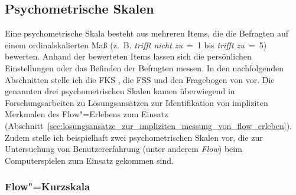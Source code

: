 \subsection{Psychometrische Skalen} 

\label{sub:psychometrische_skalen}

Eine psychometrische Skala besteht aus mehreren Items, die die Befragten auf einem ordinalskalierten Maß (z.~B. \emph{trifft nicht zu}~=~1 bis \emph{trifft zu}~=~5) bewerten. Anhand der bewerteten Items lassen sich die persönlichen Einstellungen oder das Befinden der Befragten messen. In den nachfolgenden Abschnitten stelle ich die \ac{FKS} \citep{Rheinberg2003}, die \ac{FSS} \citep{Jackson1996} und den Fragebogen von \citet{Keller2008} vor. Die genannten drei psychometrischen Skalen kamen überwiegend in Forschungsarbeiten zu Lösungsansätzen zur Identifikation von impliziten Merkmalen des Flow"=Erlebens zum Einsatz (Abschnitt~\ref{sec:losungsansatze_zur_impliziten_messung_von_flow_erleben}). Zudem stelle ich beispielhaft zwei psychometrischen Skalen vor, die zur Untersuchung von Benutzererfahrung (unter anderem \emph{Flow}) beim Computerspielen zum Einsatz gekommen sind. 

\subsubsection{Flow"=Kurzskala} 

\label{ssub:flow_kurzskala}

